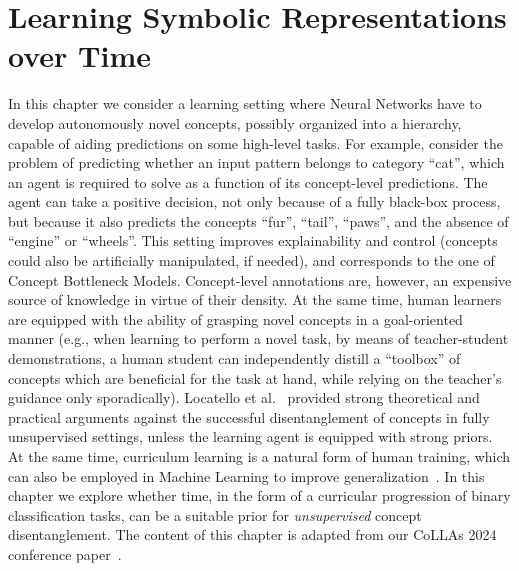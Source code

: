 \chapter{Learning Symbolic Representations over Time}
\label{chap:kandycem}


In this chapter we consider a learning setting where Neural Networks have to develop autonomously novel concepts, possibly organized into a hierarchy, capable of aiding predictions on some high-level tasks.
For example, consider the problem of predicting whether an input pattern belongs to category ``cat'', which an agent is required to solve as a function of its concept-level predictions. %
The agent can take a positive decision, not only because of a fully black-box process, but because it also predicts the concepts ``fur'', ``tail'', ``paws'', and the absence of ``engine'' or ``wheels''. This setting improves explainability and control (concepts could also be artificially manipulated, if needed), and corresponds to the one of Concept Bottleneck Models.
Concept-level annotations are, however, an expensive source of knowledge in virtue of their density. At the same time, human learners are equipped with the ability of grasping novel concepts in a goal-oriented manner (e.g., when learning to perform a novel task, by means of teacher-student demonstrations, a human student can independently distill a ``toolbox'' of concepts which are beneficial for the task at hand, while relying on the teacher's guidance only sporadically).
Locatello et al.~\cite{locatello2019challenging} provided strong theoretical and practical arguments against the successful disentanglement of concepts in fully unsupervised settings, unless the learning agent is equipped with strong priors.
At the same time, curriculum learning is a natural form of human training, which can also be employed in Machine Learning to improve generalization~\cite{bengio2009curriculum}.
In this chapter we explore whether time, in the form of a curricular progression of binary classification tasks, can be a suitable prior for \textit{unsupervised} concept disentanglement.
The content of this chapter is adapted from our CoLLAs 2024 conference paper~\cite{lorello2024continual}.

